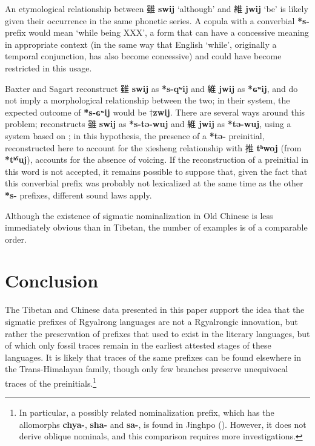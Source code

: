 \documentclass[oneside,a4paper,11pt]{article}
\newcommand{\ipa}[1]{\textbf{{\phon\mbox{#1}}}} %
\newcommand{\zh}[1]{{\cn #1}}
\newcommand{\zhc}[2]{\zh{#1} \ipa{#2}}
\begin{document}
An etymological relationship between \zhc{雖}{swij} `although' and \zhc{維}{jwij} `be' is likely given their occurrence in the same phonetic series. A copula with a converbial \ipa{*s-} prefix would mean `while being XXX', a form that can have a concessive meaning in appropriate context (in the same way that English `while', originally a temporal conjunction, has also become concessive) and could have become restricted in this usage.

Baxter and Sagart reconstruct \zhc{雖}{swij} as \ipa{*s-qʷij} and \zhc{維}{jwij} as  \ipa{*ɢʷij}, and do not imply a morphological relationship between the two; in their system, the expected outcome of \ipa{*s-ɢʷij} would be $\dagger$\ipa{zwij}. There are several ways around this problem; \citet{jacques00ywij} reconstructs \zhc{雖}{swij} as \ipa{*s-tə-wuj} and  \zhc{維}{jwij} as  \ipa{*tə-wuj}, using a system based on \citet{sagart99roc}; in this hypothesis, the presence of a \ipa{*tə-} preinitial, reconstructed here to account for the xiesheng relationship with \zhc{推}{tʰwoj} (from \ipa{*tʰˁuj}), accounts for the absence of voicing. If the reconstruction of a preinitial in this word is not accepted, it remains possible to suppose that, given the fact that this converbial prefix was probably not lexicalized at the same time as the other \ipa{*s-} prefixes, different sound laws apply.

 Although the existence of sigmatic nominalization in Old Chinese is less immediately obvious than in Tibetan, the number of examples is of a comparable order.

\section{Conclusion}
The Tibetan and Chinese data presented in this paper support the idea that the sigmatic prefixes of Rgyalrong languages are not a Rgyalrongic innovation, but rather the preservation of  prefixes that used to exist in the literary languages, but of which only fossil traces remain in the earliest attested stages of these languages. It is likely that traces of the same prefixes can be found elsewhere in the Trans-Himalayan family, though only few branches preserve unequivocal traces of the preinitials.\footnote{In particular, a possibly related nominalization prefix, which has the allomorphs \ipa{chya-}, \ipa{sha-} and \ipa{sa-}, is found in Jinghpo (\citealt[3-4]{dai90yufa}). However, it does not derive oblique nominals, and this comparison requires more investigations. }
\end{document}
